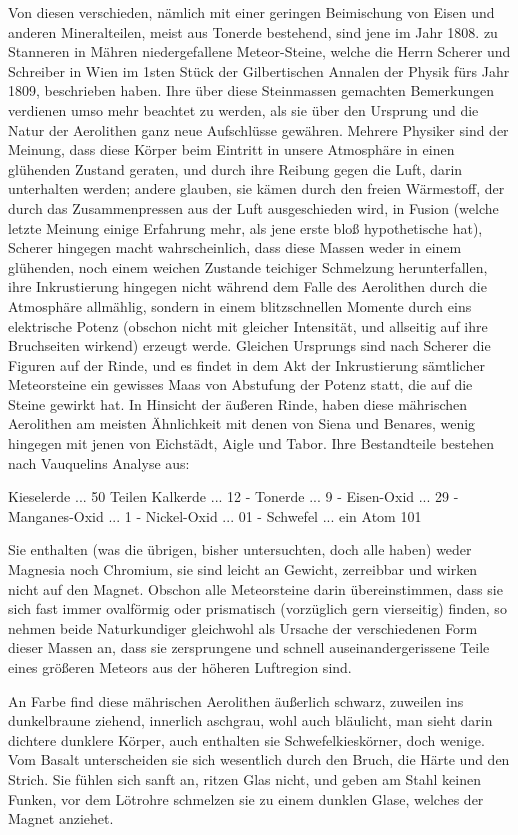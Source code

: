 \documentclass[a4paper, 11pt, oneside, polutonikogreek, german]{article}
\begin{document}
Von diesen verschieden, nämlich mit einer geringen Beimischung von Eisen und anderen Mineralteilen, meist aus Tonerde bestehend, sind jene im Jahr 1808. zu Stanneren in Mähren niedergefallene Meteor-Steine, welche die Herrn Scherer und Schreiber in Wien im 1sten Stück der Gilbertischen Annalen der Physik fürs Jahr 1809, beschrieben haben. Ihre über diese Steinmassen gemachten Bemerkungen verdienen umso mehr beachtet zu werden, als sie über den Ursprung und die Natur der Aerolithen ganz neue Aufschlüsse gewähren. Mehrere Physiker sind der Meinung, dass diese Körper beim Eintritt in unsere Atmosphäre in einen glühenden Zustand geraten, und durch ihre Reibung gegen die Luft, darin unterhalten werden; andere glauben, sie kämen durch den freien Wärmestoff, der durch das Zusammenpressen aus der Luft ausgeschieden wird, in Fusion (welche letzte Meinung einige Erfahrung mehr, als jene erste bloß hypothetische hat), Scherer hingegen macht wahrscheinlich, dass diese Massen weder in einem glühenden, noch einem weichen Zustande teichiger Schmelzung herunterfallen, ihre Inkrustierung hingegen nicht während dem Falle des Aerolithen durch die Atmosphäre allmählig, sondern in einem blitzschnellen Momente durch eins elektrische Potenz (obschon nicht mit gleicher Intensität, und allseitig auf ihre Bruchseiten wirkend) erzeugt werde. Gleichen Ursprungs sind nach Scherer die Figuren auf der Rinde, und es findet in dem Akt der Inkrustierung sämtlicher Meteorsteine ein gewisses Maas von Abstufung der Potenz statt, die auf die Steine gewirkt hat. In Hinsicht der äußeren Rinde, haben diese mährischen Aerolithen am meisten Ähnlichkeit mit denen von Siena und Benares, wenig hingegen mit jenen von Eichstädt, Aigle und Tabor. Ihre Bestandteile bestehen nach Vauquelins Analyse aus:

Kieselerde ... 50 Teilen
Kalkerde ... 12 -
Tonerde ... 9 -
Eisen-Oxid ... 29 -
Manganes-Oxid ... 1 -
Nickel-Oxid ... 01 -
Schwefel ... ein Atom
101

Sie enthalten (was die übrigen, bisher untersuchten, doch alle haben) weder Magnesia noch Chromium, sie sind leicht an Gewicht, zerreibbar und wirken nicht auf den Magnet. Obschon alle Meteorsteine darin übereinstimmen, dass sie sich fast immer ovalförmig oder prismatisch (vorzüglich gern vierseitig) finden, so nehmen beide Naturkundiger gleichwohl als Ursache der verschiedenen Form dieser Massen an, dass sie zersprungene und schnell auseinandergerissene Teile eines größeren Meteors aus der höheren Luftregion sind.

An Farbe find diese mährischen Aerolithen äußerlich schwarz, zuweilen ins dunkelbraune ziehend, innerlich aschgrau, wohl auch bläulicht, man sieht darin dichtere dunklere Körper, auch enthalten sie Schwefelkieskörner, doch wenige. Vom Basalt unterscheiden sie sich wesentlich durch den Bruch, die Härte und den Strich. Sie fühlen sich sanft an, ritzen Glas nicht, und geben am Stahl keinen Funken, vor dem Lötrohre schmelzen sie zu einem dunklen Glase, welches der Magnet anziehet.
\end{document}
